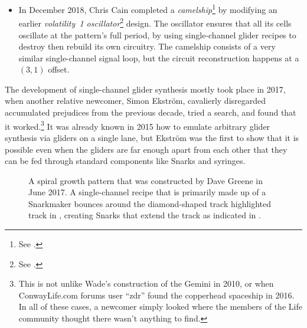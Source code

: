\begin{itemize}
	\item In December 2018, Chris Cain completed a \emph{camelship}\footnote{See .} by modifying an earlier \emph{volatility~1 oscillator}\footnote{See .} design. The oscillator ensures that all its cells oscillate at the pattern's full period, by using single-channel glider recipes to destroy then rebuild its own circuitry. The camelship consists of a very similar single-channel signal loop, but the circuit reconstruction happens at a $(3,1)$ offset.\smallskip
\end{itemize}

The development of single-channel glider synthesis mostly took place in 2017, when another relative newcomer, Simon Ekstr{\"o}m, cavalierly disregarded accumulated prejudices from the previous decade, tried a search, and found that it worked.\footnote{This is not unlike Wade's construction of the Gemini in 2010, or when ConwayLife.com forums user ``zdr'' found the copperhead spaceship in 2016. In all of these cases, a newcomer simply looked where the members of the Life community thought there wasn't anything to find.} It was already known in 2015 how to emulate arbitrary glider synthesis via gliders on a single lane, but Ekstr{\"o}m was the first to show that it is possible even when the gliders are far enough apart from each other that they can be fed through standard components like Snarks and syringes.



\begin{figure}[!htb]
	\centering
	\caption{A spiral growth pattern that was constructed by Dave Greene in June 2017. A single-channel recipe that is primarily made up of a Snarkmaker bounces around the diamond-shaped track highlighted track in , creating Snarks that extend the track as indicated in .}\label{fig:spiral_growth}
\end{figure}

\clearpage %


